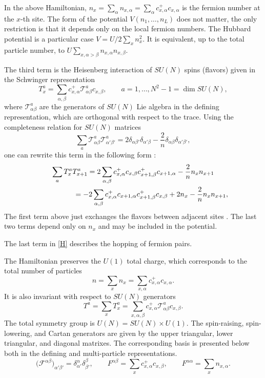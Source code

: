 \documentclass[11pt]{article}
\begin{document}
In the above Hamiltonian, $n_x=\sum_{\alpha}n_{x,\alpha}=\sum_{\alpha} c^+_{x,\alpha}c_{x,\alpha}$
is the fermion number at the $x$-th site.
The form of the potential $V(n_1,\dots,n_L)$ does not matter, the
only restriction is that it depends only on the local fermion numbers.
The Hubbard potential is a particular case
$V=U/2\sum_x n_x^2$.
It is equivalent, up to the total particle number,
to $U\sum_{x,\alpha>\beta}n_{x,\alpha}n_{x,\beta}$.


The third term is the Heisenberg interaction of $SU(N)$ spins (f\/lavors) given in
the Schwinger representation
\begin{equation}
\label{schwinger}
T_x^a=\sum_{\alpha,\beta}
c_{x,\alpha}^+ \mathcal{T}^a_{\alpha\beta} c_{x,\beta}, \qquad a=1,\dots,N^2-1=\dim SU(N),
\end{equation}
where $\mathcal{T}^a_{\alpha\beta}$ are the generators of $SU(N)$ Lie
algebra in the def\/ining representation, which are  orthogonal
with respect to the trace.
 Using the completeness relation for $SU(N)$ matrices
\[
\sum_a\mathcal{T}^a_{\alpha\beta}\mathcal{T}^a_{\alpha'\beta'}=
2\delta_{\alpha\beta'} \delta_{\alpha'\beta}  -\frac{2}{n} \delta_{\alpha\beta} \delta_{\alpha'\beta'},
\]
one can rewrite this term in the following form \cite{MA89}:
\begin{gather}
\sum_{a} T_x^a  T_{x+1}^a
=
2\sum_{\alpha,\beta} c^+_{x,\alpha}  c_{x,\beta} c^+_{x+1,\beta} c_{x+1,\alpha}
- \frac{2}{n} n_x n_{x+1}\nonumber
\\
\hphantom{\sum_{a} T_x^a  T_{x+1}^a}{}=
-2\sum_{\alpha,\beta} c^+_{x,\alpha}  c_{x+1,\alpha}  c^+_{x+1,\beta} c_{x,\beta}+2n_x- \frac{2}{n} n_x n_{x+1},\label{heis}
\end{gather}
The f\/irst term above just exchanges the f\/lavors between
adjacent sites \cite{AL86}. The last two terms depend only on $n_x$ and may be included in the potential.

The last term   in \eqref{H} describes the hopping of
fermion pairs.

The Hamiltonian preserves the $U(1)$ total charge, which corresponds to the total number
of particles
\begin{equation*}
n=\sum_{x} n_x=\sum_{x,\alpha}c_{x,\alpha}^+c_{x,\alpha}.
\end{equation*}
It is also invariant with respect to $SU(N)$ generators
\begin{equation*}
T^a=\sum_x T^a_x= \sum_{x,\alpha,\beta}c_{x,\alpha}^+ \mathcal{T}^a_{\alpha\beta}c_{x,\beta}.
\end{equation*}
The total symmetry group is $U(N)=SU(N)\times U(1)$.
The spin-raising, spin-lowering, and Cartan generators are given by
the upper triangular, lower triangular, and diagonal
matrixes. The corresponding basis is presented below
both in the def\/ining and multi-particle representations.
\begin{equation}
\label{raising}
\big(\mathcal{F}^{\alpha\beta}\big)_{\alpha'\beta'}=\delta^\alpha_{\alpha'}\delta^\beta_{\beta'},
\qquad
F^{\alpha\beta}=\sum_x c_{x,\alpha}^+ c_{x,\beta},
\qquad
F^{\alpha\alpha}=\sum_x n_{x,\alpha}.
\end{equation}
\end{document}
